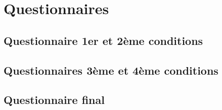 \appendix
\section{Questionnaires \label{questionnaires}}
\subsection{Questionnaire 1er et 2ème conditions \label{questionnaires1}}
\begin{figure}[!h]

\end{figure}
\newpage
\subsection{Questionnaires 3ème et 4ème conditions \label{questionnaires2}}
\begin{figure}[!h]

\end{figure}
\newpage
\subsection{Questionnaire final \label{questionnaires3}}
\begin{figure}[!h]

\end{figure}
\newpage
\begin{figure}[!h]

\end{figure}
